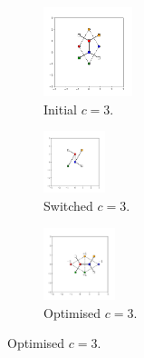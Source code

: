 \begin{figure}[h]
     \centering
     
     \begin{subfigure}[b]{0.25\textwidth}
         \centering
         \includegraphics[height=2.6cm]{./figures/general_networks/bs_move_a.pdf}
         \caption{Initial $c=3$.}
         \label{fig:bsmovea}
     \end{subfigure}
     \hfill
     \begin{subfigure}[b]{0.25\textwidth}
         \centering
         \includegraphics[height=1.8cm]{./figures/general_networks/bs_move_b.pdf}
         \caption{Switched $c=3$.}
         \label{fig:bsmoveb}
     \end{subfigure}
     \hfill
     \begin{subfigure}[b]{0.25\textwidth}
         \centering
         \includegraphics[height=2.1cm]{./figures/general_networks/bs_move_c.pdf}
         \caption{Optimised $c=3$.}
         \label{fig:bsmovec}
     \end{subfigure}
     

\end{figure}
